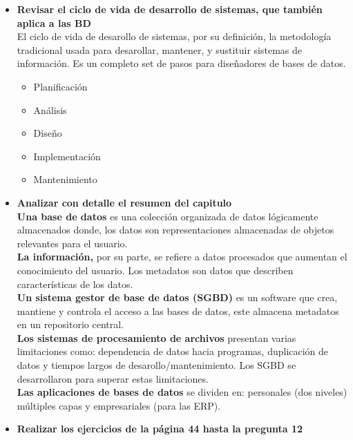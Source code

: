 \documentclass[letterpaper,12pt]{article}
\begin{document}
\begin{sloppypar}
\begin{itemize}
    \item \textbf{Revisar el ciclo de vida de desarrollo de sistemas, que también aplica a las BD} \\ El ciclo de vida de desarollo de sistemas, por su definición, la metodología tradicional usada para desarollar, mantener, y sustituir sistemas de información. Es un completo set de pasos para diseñadores de bases de datos.
    \begin{itemize}
        \item Planificación
        \item Análisis
        \item Diseño
        \item Implementación
        \item Mantenimiento
    \end{itemize} 
    
    \item \textbf{Analizar con detalle el resumen del capitulo} \\
    \textbf{Una base de datos} es una colección organizada de datos lógicamente almacenados donde, los datos son representaciones almacenadas de objetos relevantes para el usuario.
    \vspace{0.3cm}\\ 
    \textbf{La información, }por su parte, se refiere a datos procesados que aumentan el conocimiento del usuario. Los metadatos son datos que describen características de los datos.
    \vspace{0.3cm}\\ 
    \textbf{Un sistema gestor de base de datos (SGBD)} es un software que crea, mantiene y controla el acceso a las bases de datos, este almacena metadatos en un repositorio central.
    \vspace{0.3cm}\\ 
    \textbf{Los sistemas de procesamiento de archivos }presentan varias limitaciones como: dependencia de datos hacia programas, duplicación de datos y tiempos largos de desarollo/mantenimiento. Los SGBD se desarrollaron para superar estas limitaciones.
    \vspace{0.3cm}\\ 
    \textbf{Las aplicaciones de bases de datos} se dividen en: personales  (dos niveles) múltiples capas y empresariales (para las ERP).
    \newpage
    \item \textbf{Realizar los ejercicios de la página 44 hasta la pregunta 12}
    

\end{itemize}
\end{sloppypar}
\end{document}

